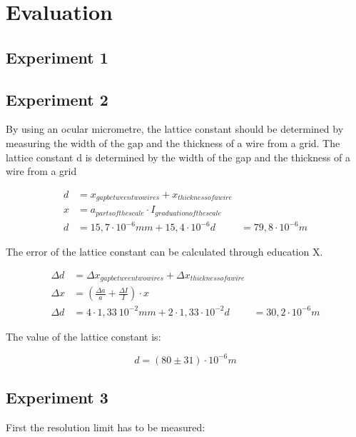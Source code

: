 \section{Evaluation}

\subsection{Experiment 1}

\subsection{Experiment 2}

By using an ocular micrometre, the lattice constant should be determined by measuring the width of the gap and the thickness of a wire from a grid.
The lattice constant d is determined by the width of the gap and the thickness of a wire from a grid


\begin{align*}
    d & = x_{gap between two wires} + x_{thickness of a wire} \\
    x & = a_{parts of the scale} \cdot I_{graduation of the scale} \\
    d & = 15,7 \cdot 10^{-6} mm + 15,4 \cdot 10^{-6} 
    d & = 79,8 \cdot 10^{-6} m
\end{align*}

The error of the lattice constant can be calculated through education X.


\begin{align*}
   \Delta d & = \Delta x_{gap between two wires} + \Delta x_{thickness of a wire} \\
    \Delta x & = (\frac{\Delta a}{a} + \frac{\Delta I}{I}) \cdot x \\
    \Delta d & = 4 \cdot 1,33 \ 10^{-2} mm + 2 \cdot 1,33 \cdot 10^{-2} 
    d & = 30,2 \cdot 10^{-6} m
\end{align*}

The value of the lattice constant is:

\begin{equation}
    d = (80 \pm 31) \cdot 10^{-6} m
\end{equation}

\subsection{Experiment 3}

First the resolution limit has to be measured:

